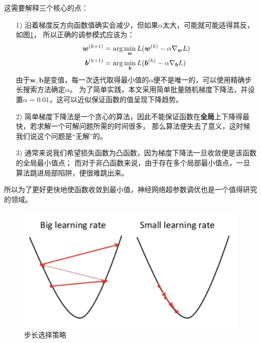 \documentclass[12pt,a4paper]{ctexart}
\numberwithin{equation}{section}%
\numberwithin{figure}{section}%
\begin{document}
这需要解释三个核心的点：
\begin{itemize}
    \item [1)] 
    沿着梯度反方向函数值确实会减少，但如果$\alpha$太大，可能就可能适得其反，如图\ref{步长选择策略}，
    所以正确的调参模式应该为：
    \begin{align}
        \boldsymbol{w}^{(k+1)}&=\arg \min \limits_{\boldsymbol{w}}L(\boldsymbol{w}^{(k)}- \alpha \nabla_{\boldsymbol{w}} L) \notag  \\
        \boldsymbol{b}^{(k+1)}&=\arg \min \limits_{\boldsymbol{b}} L(\boldsymbol{b}^{(k)}- \alpha \nabla_{\boldsymbol{b}} L) \label{tiduxiajiang1}
    \end{align}
    由于$\boldsymbol{w,b}$是变值，每一次迭代取得最小值的$\alpha$便不是唯一的，可以使用精确步长搜索方法确定$\alpha$。
    为了简单实践，本文采用简单批量随机梯度下降法，并设置$\alpha=0.01$，这可以近似保证函数的值呈现下降趋势。
    \item [2)] 
    简单梯度下降法是一个贪心的算法，因此不能保证函数在\textbf{全局}上下降得最快，若求解一个可解问题所需的时间很多，
    那么算法便失去了意义，这时候我们说这个问题是“无解”的。
    \item[3)]
    通常来说我们希望损失函数为凸函数，因为梯度下降法一旦收敛便是该函数的全局最小值点；
    而对于非凸函数来说，由于存在多个局部最小值点，一旦算法跳进局部陷阱，便很难跳出来。
\end{itemize}
所以为了更好更快地使函数收敛到最小值，神经网络超参数调优也是一个值得研究的领域。
\begin{figure}[!h] %
    \centering %
    \includegraphics[scale=0.6]{tiduxiajiang.png} %
    \caption{步长选择策略}
    \label{步长选择策略} %
    \end{figure}
\end{document}
